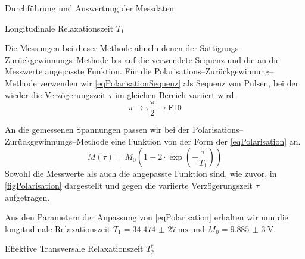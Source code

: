 \documentclass[pdftex, a4paper,11pt, twoside, ngerman]{report}
\begin{document}
\begin{chapter}{Durchführung und Auswertung der Messdaten}
\begin{section}{
        Longitudinale Relaxationszeit $T_{1}$}
\begin{subsection}
        Die Messungen bei dieser Methode ähneln denen der Sättigungs--
        Zurückgewinnungs--Methode bis auf die verwendete Sequenz und die an die
        Messwerte angepasste Funktion.
        Für die Polarisations--Zurückgewinnung--Methode verwenden wir
        \cref{eqPolarisationSequenz} als Sequenz von Pulsen, bei der wieder die
        Verzögerungszeit $\tau$ im gleichen Bereich variiert wird.
        \begin{equation}
          \label{eqPolarisationSequenz}
          \pi \rightarrow \tau \frac{\pi}{2} \rightarrow \mathtt{FID}
        \end{equation}
        
        An die gemessenen Spannungen passen wir bei der Polarisations--
        Zurückgewinnungs--Methode eine Funktion von der Form der
        \cref{eqPolarisation} an.
        \begin{equation}
          \label{eqPolarisation}
          M(\tau)=M_{0}\left(1-2\cdot\exp\left(-\frac{\tau}{T_{1}}\right)\right)
        \end{equation}
        Sowohl die Messwerte als auch die angepasste Funktion sind, wie zuvor,
        in \cref{figPolarisation} dargestellt und gegen die variierte
        Verzögerungszeit $\tau$ aufgetragen.
        
        Aus den Parametern der Anpassung von \cref{eqPolarisation} erhalten
        wir nun die longitudinale Relaxationszeit
        $T_{1}=\SI{34,474(27)}{\milli\second}$ und $M_{0}=\SI{9,885(3)}{\volt}$.
        
        
      \end{subsection}
      
      
    \end{section}
    
    
    
    \begin{section}{
        Effektive Transversale Relaxationszeit $T_{2}^{*}$}
      \label{chpEffTransRelax}
      
      

\end{section}
\end{chapter}
\end{document}
